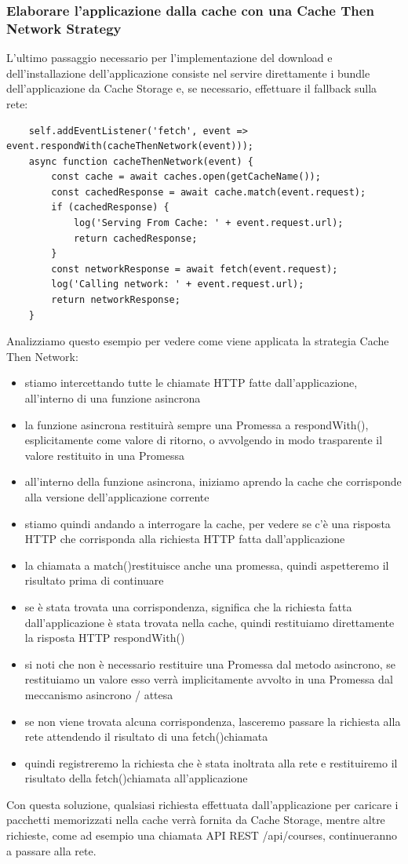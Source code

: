\documentclass[italian]{article}
\begin{document}
\subsubsection{Elaborare l'applicazione dalla cache con una Cache Then Network Strategy}
L'ultimo passaggio necessario per l'implementazione del download e dell'installazione dell'applicazione consiste nel servire direttamente i bundle dell'applicazione da Cache Storage e, se necessario, effettuare il fallback sulla rete:
\begin{lstlisting}
	self.addEventListener('fetch', event => event.respondWith(cacheThenNetwork(event)));
	async function cacheThenNetwork(event) {
		const cache = await caches.open(getCacheName());
		const cachedResponse = await cache.match(event.request);
		if (cachedResponse) {
			log('Serving From Cache: ' + event.request.url);
			return cachedResponse;
		}
		const networkResponse = await fetch(event.request);
		log('Calling network: ' + event.request.url);	
		return networkResponse;
	}
\end{lstlisting}
Analizziamo questo esempio per vedere come viene applicata la strategia Cache Then Network:
\begin{itemize}
\item stiamo intercettando tutte le chiamate HTTP fatte dall'applicazione, all'interno di una funzione asincrona
\item la funzione asincrona restituirà sempre una Promessa a respondWith(), esplicitamente come valore di ritorno, o avvolgendo in modo trasparente il valore restituito in una Promessa
\item all'interno della funzione asincrona, iniziamo aprendo la cache che corrisponde alla versione dell'applicazione corrente
\item stiamo quindi andando a interrogare la cache, per vedere se c'è una risposta HTTP che corrisponda alla richiesta HTTP fatta dall'applicazione
\item la chiamata a match()restituisce anche una promessa, quindi aspetteremo il risultato prima di continuare
\item se è stata trovata una corrispondenza, significa che la richiesta fatta dall'applicazione è stata trovata nella cache, quindi restituiamo direttamente la risposta HTTP respondWith()
\item si noti che non è necessario restituire una Promessa dal metodo asincrono, se restituiamo un valore esso verrà implicitamente avvolto in una Promessa dal meccanismo asincrono / attesa
\item se non viene trovata alcuna corrispondenza, lasceremo passare la richiesta alla rete attendendo il risultato di una fetch()chiamata
\item quindi registreremo la richiesta che è stata inoltrata alla rete e restituiremo il risultato della fetch()chiamata all'applicazione
\end{itemize}
Con questa soluzione, qualsiasi richiesta effettuata dall'applicazione per caricare i pacchetti memorizzati nella cache verrà fornita da Cache Storage, mentre altre richieste, come ad esempio una chiamata API REST /api/courses, continueranno a passare alla rete.
\end{document}
